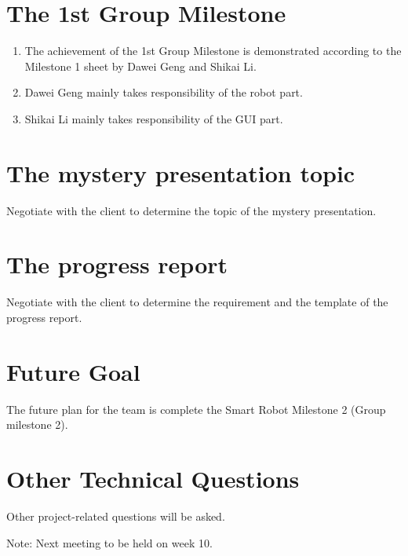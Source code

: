 \documentclass[11pt, a4paper]{article}
\begin{document}
\section{The 1st Group Milestone}
\begin{enumerate}
\item The achievement of the 1st Group Milestone is demonstrated according to the Milestone 1 sheet by Dawei Geng and Shikai Li.
\item Dawei Geng mainly takes responsibility of the robot part. 
\item Shikai Li mainly takes responsibility of the GUI part.  
\end{enumerate}

\section{The mystery presentation topic}
Negotiate with the client to determine the topic of the mystery presentation.

\section{The progress report}
Negotiate with the client to determine the requirement and the template of the progress report.   

\section{Future Goal}
The future plan for the team is complete the Smart Robot Milestone 2 (Group milestone 2).

\section{Other Technical Questions}
Other project-related questions will be asked.



\vspace*{10pt}
\noindent Note: Next meeting to be held on week 10.
\end{document}
